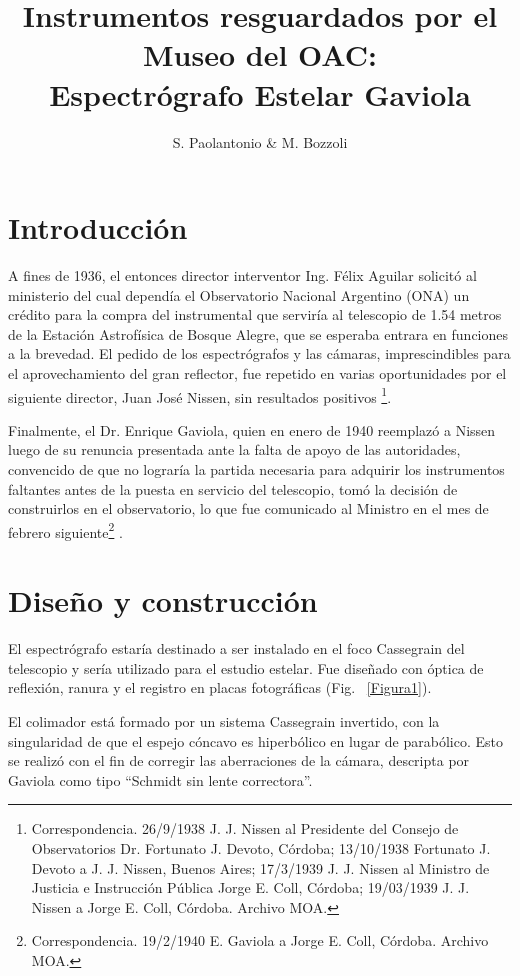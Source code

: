 \documentclass[baaa]{baaa}
\title{Instrumentos resguardados por el Museo del OAC: \\ Espectrógrafo Estelar Gaviola}
\author{
S. Paolantonio\inst{1} \&
M. Bozzoli\inst{1,2,3}
}
\institute{
Museo del Observatorio Astronómico de Córdoba, UNC, Argentina
\and
Facultad de Filosofía y Humanidades, UNC, Argentina
\and
Consejo Nacional de Investigaciones Científicas y Técnicas, Argentina
}
\begin{document}
\maketitle
\section{Introducci\'on}\label{S_intro}

A fines de 1936, el entonces director interventor Ing. Félix Aguilar solicitó al ministerio del cual dependía el Observatorio Nacional Argentino (ONA) un crédito para la compra del instrumental que serviría al telescopio de 1.54 metros de la Estación Astrofísica de Bosque Alegre, que se esperaba entrara en funciones a la brevedad. El pedido de los espectrógrafos y las cámaras, imprescindibles para el aprovechamiento del gran reflector, fue repetido en varias oportunidades por el siguiente director, Juan José Nissen, sin resultados positivos \footnote{Correspondencia. 26/9/1938 J. J. Nissen al Presidente del Consejo de Observatorios Dr. Fortunato J. Devoto, Córdoba; 13/10/1938 Fortunato J. Devoto a J. J. Nissen, Buenos Aires; 17/3/1939 J. J. Nissen al Ministro de Justicia e Instrucción Pública Jorge E. Coll, Córdoba;  19/03/1939 J. J. Nissen a Jorge E. Coll, Córdoba. Archivo MOA.}. 

Finalmente, el Dr. Enrique Gaviola, quien en enero de 1940 reemplazó a Nissen luego de su renuncia presentada ante la falta de apoyo de las autoridades, convencido de que no lograría la partida necesaria para adquirir los instrumentos faltantes antes de la puesta en servicio del telescopio, tomó la decisión de construirlos en el observatorio, lo que fue comunicado al Ministro en el mes de febrero siguiente\footnote{Correspondencia. 19/2/1940 E. Gaviola a Jorge E. Coll, Córdoba. Archivo MOA.} \citep{cordobaestelar}.

\section{Diseño y construcción}

El espectrógrafo estaría destinado a ser instalado en el foco Cassegrain del telescopio y sería utilizado para el estudio estelar. Fue diseñado con óptica de reflexión, ranura y el registro en placas fotográficas (Fig. ~\ref{Figura1}). 

El colimador está formado por un sistema Cassegrain invertido, con la singularidad de que el espejo cóncavo es hiperbólico en lugar de parabólico. Esto se realizó con el fin de corregir las aberraciones de la cámara, descripta por Gaviola como tipo “Schmidt sin lente correctora”.
\end{document}
